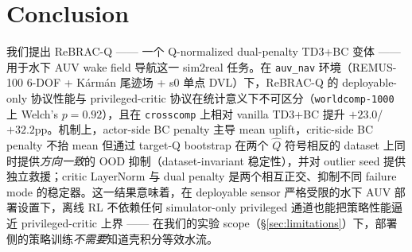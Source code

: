 %
%

\section{Conclusion}\label{sec:conclusion}

我们提出 ReBRAC-Q —— 一个 Q-normalized dual-penalty TD3+BC 变体 —— 用于水下 AUV wake field 导航这一 sim2real 任务。在 \texttt{auv\_nav} 环境（REMUS-100 6-DOF + Kármán 尾迹场 + s0 单点 DVL）下，ReBRAC-Q 的 deployable-only 协议性能与 privileged-critic 协议在统计意义下不可区分（\texttt{worldcomp-1000} 上 Welch's $p = 0.92$），且在 \texttt{crosscomp} 上相对 vanilla TD3+BC 提升 $+23.0$/$+32.2$pp。机制上，actor-side BC penalty 主导 mean uplift，critic-side BC penalty 不抬 mean 但通过 target-Q bootstrap 在两个 $\hat{Q}$ 符号相反的 dataset 上同时提供\emph{方向一致}的 OOD 抑制（dataset-invariant 稳定性），并对 outlier seed 提供独立救援；critic LayerNorm 与 dual penalty 是两个相互正交、抑制不同 failure mode 的稳定器。这一结果意味着，在 deployable sensor 严格受限的水下 AUV 部署设置下，离线 RL 不依赖任何 simulator-only privileged 通道也能把策略性能逼近 privileged-critic 上界 —— 在我们的实验 scope（\S\ref{sec:limitations}）下，部署侧的策略训练\emph{不需要}知道壳积分等效水流。
